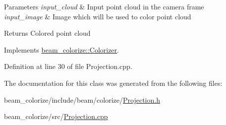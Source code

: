 \begin{DoxyParams}{Parameters}
{\em input\+\_\+cloud} & Input point cloud in the camera frame \\
\hline
{\em input\+\_\+image} & Image which will be used to color point cloud \\
\hline
\end{DoxyParams}
\begin{DoxyReturn}{Returns}
Colored point cloud 
\end{DoxyReturn}


Implements \hyperlink{classbeam__colorize_1_1_colorizer_ab9ca2ddf55fd8782e6b31c64e85efcbc}{beam\+\_\+colorize\+::\+Colorizer}.



Definition at line 30 of file Projection.\+cpp.



The documentation for this class was generated from the following files\+:\begin{DoxyCompactItemize}
\item 
beam\+\_\+colorize/include/beam/colorize/\hyperlink{_projection_8h}{Projection.\+h}\item 
beam\+\_\+colorize/src/\hyperlink{_projection_8cpp}{Projection.\+cpp}\end{DoxyCompactItemize}
